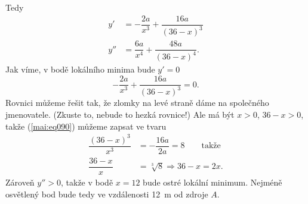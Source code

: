 \begin{mathexam}
\begin{equation*}
  \end{equation*}  
  Tedy 
  \begin{align*}
    y'  &= -\dfrac{2a}{x^3} + \dfrac{16a}{(36 - x)^3} \\
    y'' &=  \dfrac{6a}{x^4} + \dfrac{48a}{(36 - x)^4}. 
  \end{align*}
  Jak víme, v bodě lokálního minima bude \(y' = 0\)
  \begin{equation}\label{mai:eq090}
    -\dfrac{2a}{x^3} + \dfrac{16a}{(36 - x)^3} = 0.
  \end{equation}
  Rovnici můžeme řešit tak, že zlomky na levé straně dáme na společného jmenovatele. (Zkuste to,
  nebude to hezká rovnice!) Ale má být \(x > 0\), \(36 - x > 0\), takže (\ref{mai:eq090}) můžeme
  zapsat ve tvaru
  \begin{align*}
    \dfrac{(36 - x)^3}{x^3} &= -\dfrac{16a}{2a} = 8 \qquad\text{takže}      \\
    \dfrac{36 - x}{x}       &= \sqrt[3]{8} \Rightarrow 36 - x = 2x.
  \end{align*}
  Zároveň \(y''>0\), takže v bodě \(x=12\) bude ostré lokální minimum. Nejméně osvětlený bod bude
  tedy ve vzdálenosti \qty{12}{\m} od zdroje \(A\).

  {\centering
  \captionsetup{type=figure}
  \label{mai:fig064}
  \par}   
\end{mathexam}